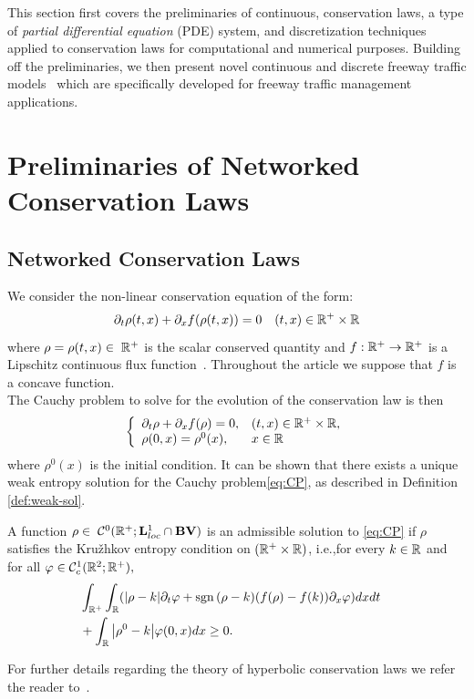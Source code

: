 This section first covers the preliminaries of continuous, conservation laws, a type of \emph{partial differential equation} (PDE) system, and discretization techniques applied to conservation laws for computational and numerical purposes. Building off the preliminaries, we then present novel continuous and discrete freeway traffic models~\cite{delle2014pde} which are specifically developed for freeway traffic management applications.

\section{Preliminaries of Networked Conservation Laws}
\label{sec:preliminaries}

\subsection{Networked Conservation Laws}

We consider the non-linear conservation equation of the form:
\begin{equation}
\partial_t\rho\left(t,x\right)+\partial_x f\left(\rho\left(t,x\right)\right)=0 \quad (t,x) \in \R^+ \times \R\label{eq:cons}
\end{equation}
where $\rho=\rho(t,x) \in \; \mathbb{R}^+$ is the scalar conserved quantity and $f:\mathbb{R}^+\rightarrow \mathbb{R}^+$ is a Lipschitz continuous flux function~\cite{MR1816648}. Throughout the article we suppose that $f$ is a concave function. \\
The Cauchy problem to solve for the evolution of the conservation law is then 
\begin{equation}
	\label{eq:CP}
		\left\{
		\begin{array}{ll}
		\partial_t \rho+ \partial_x f(\rho) =0, & (t,x)\in\R^+\times \R,\\
		\rho(0,x)=\rho^0(x), & x \in \R\\
		\end{array}
		\right.
\end{equation}
where $\rho^0(x)$ is the initial condition.
It can be shown that there exists a unique weak entropy solution for the Cauchy problem\eqref{eq:CP},  as described in Definition \ref{def:weak-sol}. 
\begin{defn}\label{def:weak-sol}
A function $\rho \in \; \mathcal{C}^0(\mathbb{R}^+; \mathbf{L}^1_{loc}\cap \mathbf{BV})$ is an admissible solution to \eqref{eq:CP} if $\rho$ satisfies the Kru\v{z}hkov entropy condition \cite{Kruzhkov} on $(\mathbb{R}^+\times\mathbb{R})$, i.e.,for every $k\in \mathbb{R}$ and for all $\varphi \in \mathcal{C}^1_c(\mathbb{R}^2;\mathbb{R}^+),$
\begin{eqnarray}
\label{eq:kruzhkov}
	&\int_{\R^+}\int_{\R}(\modulo{\rho -k}  \partial_t \varphi + \sgn{(\rho-k }) (f(\rho)-f(k))\partial_x\varphi)dxdt& \nonumber\\
	 &+\int_{\R}\modulo{\rho^0-k}\varphi(0,x)dx\geq 0.&
\end{eqnarray} 
\end{defn}
For further details regarding the theory of hyperbolic conservation laws we refer the reader to~\cite{garavello2006traffic,Evans1998}.

